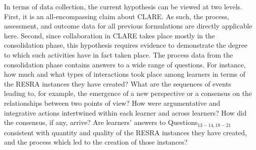 In terms of data collection, the current hypothesis can be viewed at two
levels. First, it is an all-encompassing claim about CLARE. As such, the
process, assessment, and outcome data for all previous formulations are
directly applicable here. Second, since collaboration in CLARE takes place
mostly in the consolidation phase, this hypothesis requires evidence to
demonstrate the degree to which such activities have in fact taken place.
The process data from the consolidation phase contains answers to a wide
range of questions. For instance, how much and what types of interactions
took place among learners in terms of the RESRA instances they have
created?  What are the sequences of events leading to, for example, the
emergence of a new perspective or a consensus on the relationships between
two points of view?  How were argumentative and integrative actions
intertwined within each learner and across learners? How did the consensus,
if any, arrive?  Are learners' answers to Questions\(_{13-14, 18-21}\)
consistent with quantity and quality of the RESRA instances they have
created, and the process which led to the creation of those instances?

